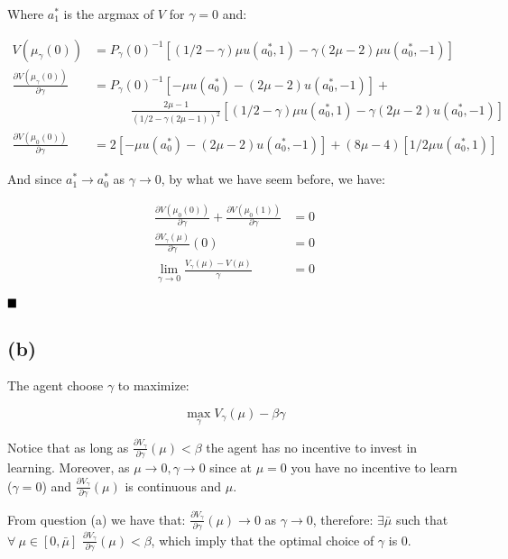 \documentclass{article}
\begin{document}
Where $a_1^*$ is the argmax of $V$ for $\gamma = 0$ and:

\[
\begin{split}
  V(\mu_\gamma(0)) & =  P_\gamma(0)^{-1} 
    [(1/2 - \gamma)\mu u(a_0^*, 1) - \gamma(2\mu - 2)\mu u(a_0^*, -1)] \\
  \frac{\partial V(\mu_\gamma(0))}{\partial \gamma} & = P_\gamma(0)^{-1} 
    [-\mu u(a_0^*) - (2\mu - 2)u(a_0^*, -1)] + \\
    & \qquad\quad
    \frac{2\mu - 1}{(1/2 - \gamma(2\mu -1))^2}
    [(1/2 - \gamma)\mu u(a_0^*,1) - \gamma(2\mu - 2) u(a_0^*, -1)] \\
  \frac{\partial V(\mu_0(0))}{\partial \gamma} & = 
    2[-\mu u(a_0^*) - (2\mu - 2)u(a_0^*, -1)] +
    (8\mu - 4)[1/2\mu u(a_0^*,1)]
\end{split}
\]

And since $a_1^* \to a_0^*$ as $\gamma \to 0$, by what we have seem before,
we have:

\[
\begin{split}
  \frac{\partial V(\mu_0(0))}{\partial \gamma} +
    \frac{\partial V(\mu_0(1))}{\partial \gamma} & = 0 \\
  \frac{\partial V_\gamma(\mu)}{\partial \gamma}(0) & = 0 \\
  \lim_{\gamma \to 0} \frac{V_\gamma(\mu) - V(\mu)}{\gamma} & = 0
\end{split}
\]

$\hfill\blacksquare$


\subsection{(b)} %

The agent choose $\gamma$ to maximize:

\begin{equation}
  \max_\gamma V_\gamma(\mu) - \beta\gamma
\end{equation}

Notice that as long as $\frac{\partial V_\gamma}{\partial \gamma}(\mu) < \beta$ the agent
has no incentive to invest in learning. Moreover, as $\mu \to 0, \gamma \to 0$ since
at $\mu = 0$ you have no incentive to learn ($\gamma = 0$) and 
$\frac{\partial V_\gamma}{\partial \gamma}(\mu)$ is continuous and $\mu$.

From question (a) we have that: $\frac{\partial V_\gamma}{\partial \gamma}(\mu) \to 0$
as $\gamma \to 0$, therefore: $\exists \bar\mu$ such that $\forall\ \mu \in [0, \bar\mu]$
$\frac{\partial V_\gamma}{\partial \gamma}(\mu) < \beta$, which imply that the optimal choice
of $\gamma$ is 0.
\end{document}
